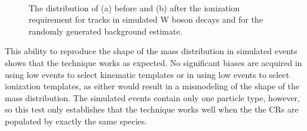 \begin{figure}[h]
\centering
{}
\\
\caption{The distribution of \mdedx (a) before and (b) after the ionization requirement for tracks in simulated W boson decays and for the randomly generated background estimate.}
\label{fig:closure_mass}
\end{figure}

This ability to reproduce the shape of the mass distribution in simulated events shows that the technique works as expected.
No significant biases are acquired in using low \dedx events to select kinematic templates or in using low \met events to select ionization templates, as either would result in a mismodeling of the shape of the mass distribution.
The simulated events contain only one particle type, however, so this test only establishes that the technique works well when the the \acp{CR} are populated by exactly the same species.

